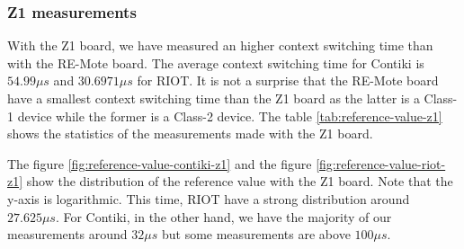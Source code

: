 \subsubsection{Z1 measurements}
With the Z1 board, we have measured an higher context switching time than with the RE-Mote board. The average context switching time for Contiki is $54.99\mu s$ and $30.6971 \mu s$ for RIOT.
It is not a surprise that the RE-Mote board have a smallest context switching time than the Z1 board as the latter is a Class-1 device while the former is a Class-2 device.
The table \ref{tab:reference-value-z1} shows the statistics of the measurements made with the Z1 board.



The figure \ref{fig:reference-value-contiki-z1} and the figure \ref{fig:reference-value-riot-z1} show the distribution of the reference value with the Z1 board.
Note that the y-axis is logarithmic.
This time, RIOT have a strong distribution around $27.625\mu s$.
For Contiki, in the other hand, we have the majority of our measurements around $32\mu s$ but some measurements are above $100 \mu s$.

